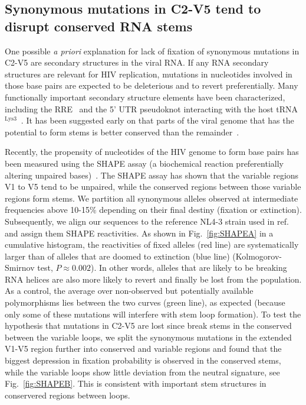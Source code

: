 \documentclass[rmp, twocolumn]{revtex4}
\newcommand{\FIG}[1]{Fig.~\ref{fig:#1}}
\begin{document}
\subsection{Synonymous mutations in C2-V5 tend to disrupt conserved RNA stems}

One possible {\it a priori} explanation for lack of fixation of synonymous
mutations in C2-V5 are  secondary structures in the viral RNA. If any RNA
secondary structures are relevant for HIV replication, mutations in nucleotides
involved in those base pairs are expected to be deleterious and to revert
preferentially. Many functionally important secondary structure elements have
been characterized, including  the RRE~\citep{fernandes_hiv-1_2012} and the 5'
UTR pseudoknot interacting with the host
tRNA$^\text{Lys3}$~\citep{barat_interaction_1991, paillart_vitro_2002}. It has
been suggested early on that parts of the viral genome that has the potential to
form stems is better conserved than the
remainder~\citep{forsdyke_reciprocal_1995}.

Recently, the propensity of nucleotides of the HIV genome to form base pairs has
been measured using the SHAPE assay (a biochemical reaction preferentially
altering unpaired bases)~\citep{watts_architecture_2009}. The SHAPE assay has
shown that the variable regions V1 to V5 tend to be unpaired, while the
conserved regions between those variable regions form stems. We partition all
synonymous alleles observed at intermediate frequencies above 10-15\% depending
on their final destiny (fixation or extinction). Subsequently, we align our
sequences to the reference NL4-3 strain used in
ref.~\citep{watts_architecture_2009} and assign them SHAPE reactivities. As
shown in \FIG{SHAPEA} in a cumulative histogram, the reactivities of fixed
alleles (red line) are systematically larger than of alleles that are doomed to
extinction (blue line) (Kolmogorov-Smirnov test, $P\approx 0.002$).
In other words, alleles that are likely to be
breaking RNA helices are also more likely to revert and finally be lost from the
population. As a control, the average over non-observed but potentially
available polymorphisms lies between the two curves (green line), as expected
(because only some of these mutations will interfere with stem loop formation).
To test the hypothesis that mutations in C2-V5 are lost since break stems
in the conserved between the variable loops, we split the synonymous mutations
in the extended V1-V5 region further into conserved and variable regions and
found that the biggest depression in fixation probability is observed in the
conserved stems, while the variable loops show little deviation from the
neutral signature, see \FIG{SHAPEB}. This is consistent with important stem
structures in conservered regions between loops.
\end{document}

